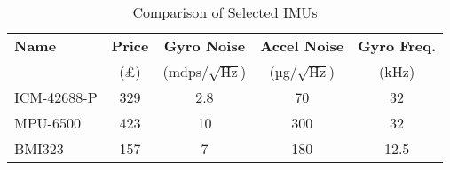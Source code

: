\begin{table}[h]
  \centering
  \begin{tabular}{lcccc}
    \toprule
    \textbf{Name} & \textbf{Price} & \textbf{Gyro Noise} & \textbf{Accel Noise} & \textbf{Gyro Freq.} \\
    & (£) & (mdps/$\sqrt{\text{Hz}}$) & (µg/$\sqrt{\text{Hz}}$) & (kHz) \\
    \midrule
    ICM-42688-P\tablefootnote{\url{https://invensense.tdk.com/products/motion-tracking/6-axis/icm-42688-p/}} & 329 & 2.8 & 70 & 32 \\
    MPU-6500\tablefootnote{\url{https://invensense.tdk.com/products/motion-tracking/6-axis/mpu-6500/}}    & 423 & 10  & 300 & 32 \\
    BMI323\tablefootnote{\url{https://www.bosch-sensortec.com/products/motion-sensors/imus/bmi323}}      & 157 & 7   & 180 & 12.5 \\
    \bottomrule
  \end{tabular}
  \caption{Comparison of Selected IMUs}
  \label{tab:imu-comparison}
\end{table}

